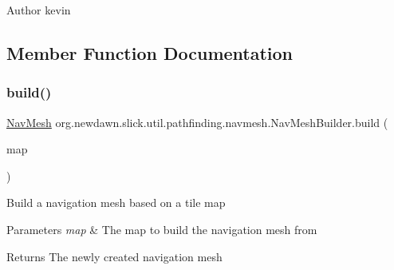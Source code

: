 \begin{DoxyAuthor}{Author}
kevin 
\end{DoxyAuthor}


\subsection{Member Function Documentation}
\mbox{\label{classorg_1_1newdawn_1_1slick_1_1util_1_1pathfinding_1_1navmesh_1_1_nav_mesh_builder_aea4af5ffd60283ed7c31a98c72da67db}} 
\subsubsection{\texorpdfstring{build()}{build()}\hspace{0.1cm}{\footnotesize\ttfamily [1/2]}}
{\footnotesize\ttfamily \mbox{\hyperlink{classorg_1_1newdawn_1_1slick_1_1util_1_1pathfinding_1_1navmesh_1_1_nav_mesh}{Nav\+Mesh}} org.\+newdawn.\+slick.\+util.\+pathfinding.\+navmesh.\+Nav\+Mesh\+Builder.\+build (\begin{DoxyParamCaption}\item[{\mbox{\hyperlink{interfaceorg_1_1newdawn_1_1slick_1_1util_1_1pathfinding_1_1_tile_based_map}{Tile\+Based\+Map}}}]{map }\end{DoxyParamCaption})\hspace{0.3cm}{\ttfamily [inline]}}

Build a navigation mesh based on a tile map


\begin{DoxyParams}{Parameters}
{\em map} & The map to build the navigation mesh from\\
\hline
\end{DoxyParams}
\begin{DoxyReturn}{Returns}
The newly created navigation mesh 
\end{DoxyReturn}

